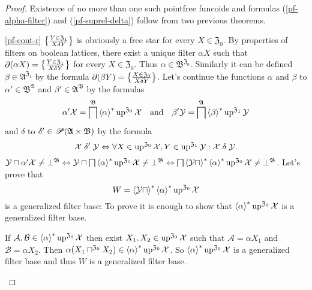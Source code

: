 \begin{proof}
Existence of no more than one such pointfree funcoids and formulas
(\ref{pf-alpha-filter}) and (\ref{pf-suprel-delta}) follow from
two previous theorems.
\begin{widedisorder}
\item [{\ref{pf-cont-r}}] $\left\{ \frac{Y\in\mathfrak{Z}_{1}}{X\mathrel\delta Y}\right\}$
is obviously a free star for every $X\in\mathfrak{Z}_{0}$. By properties
of filters on boolean lattices, there exist a unique filter $\alpha X$
such that $\partial(\alpha X)=\left\{ \frac{Y\in\mathfrak{Z}_{1}}{X\mathrel\delta Y}\right\}$
for every $X\in\mathfrak{Z}_{0}$. Thus $\alpha\in\mathfrak{B}^{\mathfrak{Z}_{0}}$.
Similarly it can be defined $\beta\in\mathfrak{A}^{\mathfrak{Z}_{1}}$
by the formula $\partial(\beta Y)=\left\{ \frac{X\in\mathfrak{Z}_{0}}{X\mathrel\delta Y}\right\}$.
Let's continue the functions $\alpha$ and $\beta$ to $\alpha'\in\mathfrak{B}^{\mathfrak{A}}$
and $\beta'\in\mathfrak{A}^{\mathfrak{B}}$ by the formulas
\[
\alpha'\mathcal{X}=\bigsqcap^{\mathfrak{B}}\left\langle \alpha\right\rangle ^{\ast}\operatorname{up}^{\mathfrak{Z}_{0}}\mathcal{X}\quad\text{and}\quad\beta'\mathcal{Y}=\bigsqcap^{\mathfrak{A}}\left\langle \beta\right\rangle ^{\ast}\operatorname{up}^{\mathfrak{Z}_{1}}\mathcal{Y}
\]
and $\delta$ to $\delta'\in\mathscr{P}(\mathfrak{A}\times\mathfrak{B})$
by the formula
\[
\mathcal{X}\mathrel{\delta'}\mathcal{Y}\Leftrightarrow\forall X\in\operatorname{up}^{\mathfrak{Z}_{0}}\mathcal{X},Y\in\operatorname{up}^{\mathfrak{Z}_{1}}\mathcal{Y}:\mathcal{X}\mathrel\delta\mathcal{Y}.
\]
$\mathcal{Y}\sqcap\alpha'\mathcal{X}\ne\bot^{\mathfrak{B}}\Leftrightarrow\mathcal{Y}\sqcap\bigsqcap\left\langle \alpha\right\rangle ^{\ast}\operatorname{up}^{\mathfrak{Z}_{0}}\mathcal{X}\ne\bot^{\mathfrak{B}}\Leftrightarrow\bigsqcap\left\langle \mathcal{Y}\sqcap\right\rangle ^{\ast}\left\langle \alpha\right\rangle ^{\ast}\operatorname{up}^{\mathfrak{Z}_{0}}\mathcal{X}\ne\bot^{\mathfrak{B}}$.
Let's prove that
\[
W=\left\langle \mathcal{Y}\sqcap\right\rangle ^{\ast}\left\langle \alpha\right\rangle ^{\ast}\operatorname{up}^{\mathfrak{Z}_{0}}\mathcal{X}
\]
is a generalized filter base: To prove it is enough to show that $\left\langle \alpha\right\rangle ^{\ast}\operatorname{up}^{\mathfrak{Z}_{0}}\mathcal{X}$
is a generalized filter base.


If $\mathcal{A},\mathcal{B}\in\left\langle \alpha\right\rangle ^{\ast}\operatorname{up}^{\mathfrak{Z}_{0}}\mathcal{X}$
then exist $X_{1},X_{2}\in\operatorname{up}^{\mathfrak{Z}_{0}}\mathcal{X}$ such
that $\mathcal{A}=\alpha X_{1}$ and $\mathcal{B}=\alpha X_{2}$.
Then $\alpha(X_{1}\sqcap^{\mathfrak{Z}_{0}}X_{2})\in\left\langle \alpha\right\rangle ^{\ast}\operatorname{up}^{\mathfrak{Z}_{0}}\mathcal{X}$.
So $\left\langle \alpha\right\rangle ^{\ast}\operatorname{up}^{\mathfrak{Z}_{0}}\mathcal{X}$ is a generalized
filter base and thus $W$ is a generalized filter base.



\end{widedisorder}
\end{proof}
